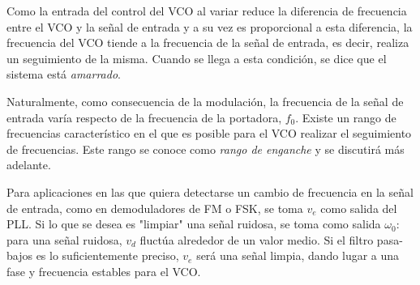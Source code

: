 Como la entrada del control del VCO al variar reduce la diferencia de frecuencia entre el VCO y la señal de entrada y a su vez es proporcional a esta diferencia, la frecuencia del VCO tiende a la frecuencia de la señal de entrada, es decir, realiza un seguimiento de la misma. Cuando se llega a esta condición, se dice que el sistema está \emph{amarrado}.

Naturalmente, como consecuencia de la modulación, la frecuencia de la señal de entrada varía respecto de la frecuencia de la portadora, $f_{0}$. Existe un rango de frecuencias característico en el que es posible para el VCO realizar el seguimiento de frecuencias. Este rango se conoce como \emph{rango de enganche} y se discutirá más adelante.

Para aplicaciones en las que quiera detectarse un cambio de frecuencia en la señal de entrada, como en demoduladores de FM o FSK, se toma $v_{e}$ como salida del PLL. Si lo que se desea es "limpiar" una señal ruidosa, se toma como salida $\omega_{0}$: para una señal ruidosa, $v_{d}$ fluctúa alrededor de un valor medio. Si el filtro pasa-bajos es lo suficientemente preciso, $v_{e}$ será una señal limpia, dando lugar a una fase y frecuencia estables para el VCO.

